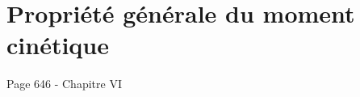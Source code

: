 \chapter{Propriété générale du moment cinétique}
\label{chapter:prop_generale_moment_cinetique}
Page 646 - Chapitre VI
